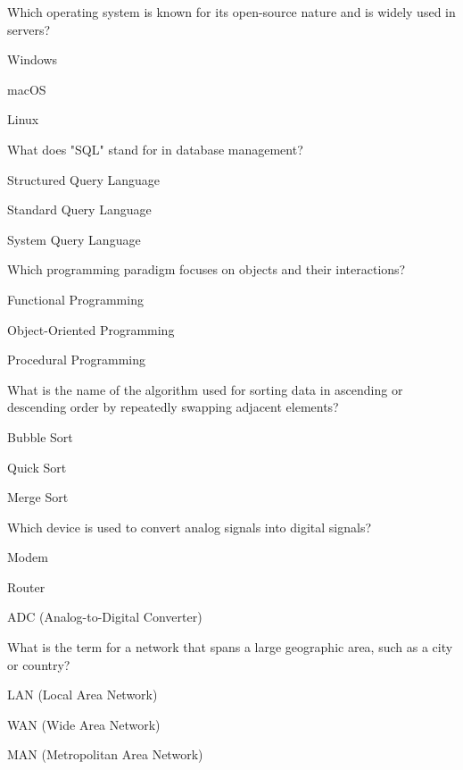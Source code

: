 \begin{enhancedmcq}{Which operating system is known for its open-source nature and is widely used in servers?}
\item Windows
\item macOS
\item Linux

\end{enhancedmcq}
\begin{enhancedmcq}{What does "SQL" stand for in database management?}
\item Structured Query Language
\item Standard Query Language
\item System Query Language

\end{enhancedmcq}
\begin{enhancedmcq}{Which programming paradigm focuses on objects and their interactions?}
\item Functional Programming
\item Object-Oriented Programming
\item Procedural Programming

\end{enhancedmcq}
\begin{enhancedmcq}{What is the name of the algorithm used for sorting data in ascending or descending order by repeatedly swapping adjacent elements?}
\item Bubble Sort
\item Quick Sort
\item Merge Sort

\end{enhancedmcq}
\begin{enhancedmcq}{Which device is used to convert analog signals into digital signals?}
\item Modem
\item Router
\item ADC (Analog-to-Digital Converter)

\end{enhancedmcq}
\begin{enhancedmcq}{What is the term for a network that spans a large geographic area, such as a city or country?}
\item LAN (Local Area Network)
\item WAN (Wide Area Network)
\item MAN (Metropolitan Area Network)

\end{enhancedmcq}
